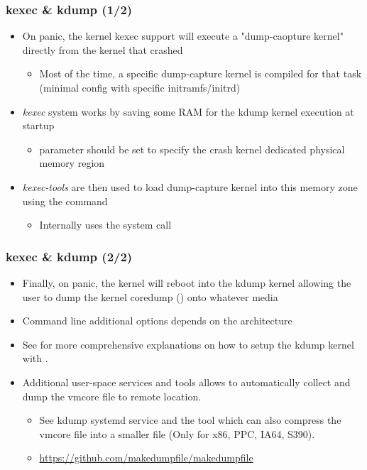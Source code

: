 \begin{frame}[fragile]
  \frametitle{kexec \& kdump (1/2)}
  \begin{itemize}
    \item On panic, the kernel kexec support will execute a "dump-caopture
      kernel" directly from the kernel that crashed
    \begin{itemize}
      \item Most of the time, a specific dump-capture kernel is compiled
        for that task (minimal config with specific initramfs/initrd)
    \end{itemize}
    \item {\em kexec} system works by saving some RAM for the kdump kernel
      execution at startup
    \begin{itemize}
      \item {} parameter should be set to specify the crash
            kernel dedicated physical memory region
    \end{itemize}
    \item {\em kexec-tools} are then used to load dump-capture kernel into
      this memory zone using the  command
    \begin{itemize}
      \item Internally uses the  system call
    \end{itemize}
  \end{itemize}
\end{frame}

\begin{frame}
  \frametitle{kexec \& kdump (2/2)}
  \begin{itemize}
    \item Finally, on panic, the kernel will reboot into the kdump kernel
      allowing the user to dump the kernel coredump () onto
      whatever media
    \item Command line additional options depends on the architecture
    \item See  for more comprehensive
      explanations on how to setup the kdump kernel with .
    \item Additional user-space services and tools allows to automatically
      collect and dump the vmcore file to remote location.
    \begin{itemize}
      \item See kdump systemd service and the  tool which
        can also compress the vmcore file into a smaller file (Only for x86,
        PPC, IA64, S390).
      \item \url{https://github.com/makedumpfile/makedumpfile}
    \end{itemize}
  \end{itemize}
\end{frame}

